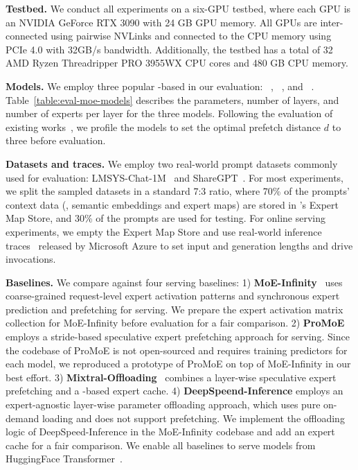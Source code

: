 \noindent \textbf{Testbed.}
We conduct all experiments on a six-GPU testbed, where each GPU is an NVIDIA GeForce RTX 3090 with 24 GB GPU memory. 
%
All GPUs are inter-connected using pairwise NVLinks and connected to the CPU memory using PCIe 4.0 with 32GB/s bandwidth. 
%
Additionally, the testbed has a total of 32 AMD Ryzen Threadripper PRO 3955WX CPU cores and 480 GB CPU memory.


\noindent \textbf{Models.}
We employ three popular \MoE-based \LLMs in our evaluation: \mixtral~\cite{jiang2024mixtral}, \qwen~\cite{yang2024qwen2}, and \phimoe~\cite{abdin2024phi}.
Table~\ref{table:eval-moe-models} describes the parameters, number of \MoE layers, and number of experts per layer for the three models.
Following the evaluation of existing works~\cite{song2024promoe}, we profile the models to set the optimal prefetch distance $d$ to three before evaluation.


\noindent \textbf{Datasets and traces.}
We employ two real-world prompt datasets commonly used for \LLM evaluation: LMSYS-Chat-1M~\cite{zheng2023lmsys} and ShareGPT~\cite{sharegpt}.
%
For most experiments, we split the sampled datasets in a standard 7:3 ratio, where 70\% of the prompts' context data (\ie, semantic embeddings and expert maps) are stored in \sys's Expert Map Store, and 30\% of the prompts are used for testing. 
%
For online serving experiments, we empty the Expert Map Store and use real-world \LLM inference traces~\cite{patel2024splitwise,stojkovic2025dynamollm} released by Microsoft Azure to set input and generation lengths and drive invocations.

\noindent \textbf{Baselines.}
We compare \sys against four \SOTA \MoE serving baselines:
1) \textbf{MoE-Infinity}~\cite{xue2024moe} uses coarse-grained request-level expert activation patterns and synchronous expert prediction and prefetching for \MoE serving. 
We prepare the expert activation matrix collection for MoE-Infinity before evaluation for a fair comparison.
%
2) \textbf{ProMoE}~\cite{song2024promoe} employs a stride-based speculative expert prefetching approach for \MoE serving. Since the codebase of ProMoE is not open-sourced and requires training predictors for each \MoE model, we reproduced a prototype of ProMoE on top of MoE-Infinity in our best effort.
%
3) \textbf{Mixtral-Offloading}~\cite{eliseev2023fast} combines a layer-wise speculative expert prefetching and a \LRU-based expert cache. 
%
4) \textbf{DeepSpeend-Inference} employs an expert-agnostic layer-wise parameter offloading approach, which uses pure on-demand loading and does not support prefetching. 
%
We implement the offloading logic of DeepSpeed-Inference in the MoE-Infinity codebase and add an expert cache for a fair comparison.
We enable all baselines to serve \MoE models from HuggingFace Transformer~\cite{wolf2020huggingface}. 


